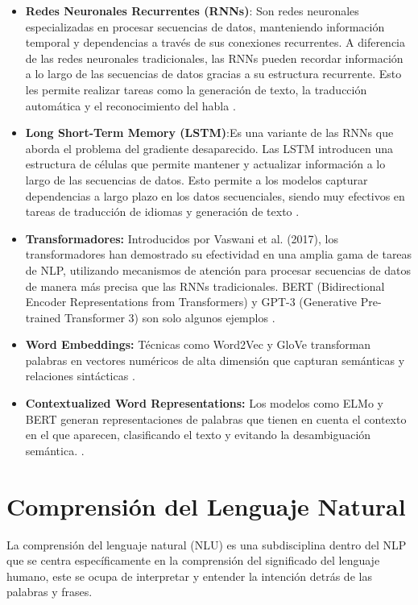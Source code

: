 \begin{itemize}
\item \textbf{Redes Neuronales Recurrentes (RNNs)}: Son redes neuronales especializadas en procesar secuencias de datos, manteniendo información temporal y dependencias a través de sus conexiones recurrentes. A diferencia de las redes neuronales tradicionales, las RNNs pueden recordar información a lo largo de las secuencias de datos gracias a su estructura recurrente. Esto les permite realizar tareas como la generación de texto, la traducción automática y el reconocimiento del habla \citep{hochreiter1997long}.

\item \textbf{Long Short-Term Memory (LSTM)}:Es una variante de las RNNs que aborda el problema del gradiente desaparecido. Las LSTM introducen una estructura de células que permite mantener y actualizar información a lo largo de las secuencias de datos. Esto permite a los modelos capturar dependencias a largo plazo en los datos secuenciales, siendo muy efectivos en tareas de traducción de idiomas y generación de texto \citep{hochreiter1997long}.
\item \textbf{Transformadores:} Introducidos por Vaswani et al. (2017), los transformadores han demostrado su efectividad en una amplia gama de tareas de NLP, utilizando mecanismos de atención para procesar secuencias de datos de manera más precisa que las RNNs tradicionales. BERT (Bidirectional Encoder Representations from Transformers) y GPT-3 (Generative Pre-trained Transformer 3) son solo algunos ejemplos \citep{vaswani2017attention, devlin2019bert}.
\item \textbf{Word Embeddings:} Técnicas como Word2Vec y GloVe transforman palabras en vectores numéricos de alta dimensión que capturan semánticas y relaciones sintácticas \citep{mikolov2013efficient, pennington2014glove}.
\item \textbf{Contextualized Word Representations:} Los modelos como ELMo y BERT generan representaciones de palabras que tienen en cuenta el contexto en el que aparecen, clasificando el texto y evitando la desambiguación semántica. \citep{peters2018deep, devlin2019bert}.

\end{itemize}

\section{Comprensión del Lenguaje Natural}\label{NLU}
La comprensión del lenguaje natural (NLU) es una subdisciplina dentro del NLP que se centra específicamente en la comprensión del significado del lenguaje humano, este se ocupa de interpretar y entender la intención detrás de las palabras y frases.

